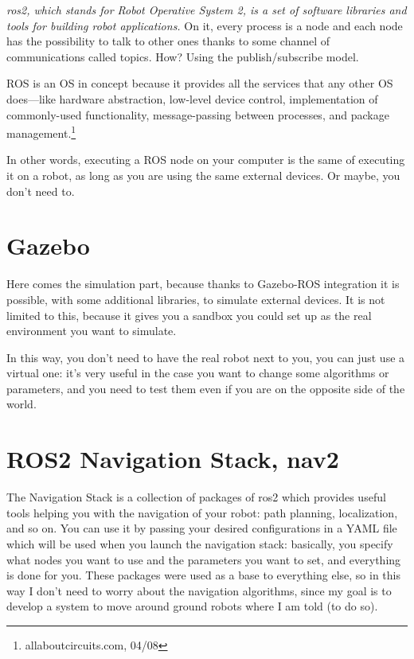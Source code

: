 {\it \Acrshort{ros2}, which stands for Robot Operative System 2, is a set of software libraries and tools for building robot applications.}\cite{ros2desc} On it, every process is a node and each node has the possibility to talk to other ones thanks to some channel of communications called topics. How? Using the publish/subscribe model.

ROS is an OS in concept because it provides all the services that any other OS does—like hardware abstraction, low-level device control, implementation of commonly-used functionality, message-passing between processes, and package management.\footnote{allaboutcircuits.com, 04/08}

In other words, executing a ROS node on your computer is the same of executing it on a robot, as long as you are using the same external devices. Or maybe, you don't need to.

\section{Gazebo}

Here comes the simulation part, because thanks to Gazebo-ROS integration it is possible, with some additional libraries, to simulate external devices. It is not limited to this, because it gives you a sandbox you could set up as the real environment you want to simulate.

In this way, you don't need to have the real robot next to you, you can just use a virtual one: it's very useful in the case you want to change some algorithms or parameters, and you need to test them even if you are on the opposite side of the world.


\section{ROS2 Navigation Stack, nav2}

The Navigation Stack is a collection of packages of \Acrshort{ros2} which provides useful tools helping you with the navigation of your robot: path planning, localization, and so on. You can use it by passing your desired configurations in a YAML file which will be used when you launch the navigation stack: basically, you specify what nodes you want to use and the parameters you want to set, and everything is done for you.
These packages were used as a base to everything else, so in this way I don't need to worry about the navigation algorithms, since my goal is to develop a system to move around ground robots where I am told (to do so).